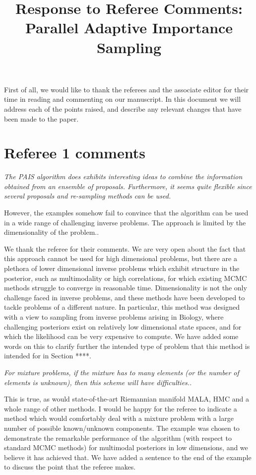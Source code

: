 \documentclass{article}
\newcommand{\comment}[2]{\vspace{0.6cm}{\bf Comment:} {\it #1.}

\vspace{0.3cm}{\bf Answer:} #2}
\begin{document}
\title{Response to Referee Comments: Parallel Adaptive Importance Sampling}
\maketitle
First of all, we would like to thank the referees and the associate editor for
their time in reading and commenting on our manuscript. In this document
we will address each of the points raised, and describe any relevant
changes that have been made to the paper.

\section*{Referee 1 comments}

\comment{The PAIS algorithm does exhibits interesting ideas to combine the information 
obtained from an ensemble of proposals. Furthermore, it seems quite flexible 
since several proposals and re-sampling methods can be used.

However, the examples somehow fail to convince that the algorithm can be used 
in a wide range of challenging inverse problems. The approach is limited by the 
dimensionality of the problem.}{We thank the referee for their comments. We are very open about the fact that this approach cannot be used for high dimensional problems, but there are a plethora of lower dimensional inverse problems which exhibit structure in the posterior, such as multimodality or high correlations, for which existing MCMC methods struggle to converge in reasonable time. Dimensionality is not the only challenge faced in inverse problems, and these methods have been developed to tackle problems of a different nature. In particular, this method was designed with a view to sampling from inverse problems arising in Biology, where challenging posteriors exist on relatively low dimensional state spaces, and for which the likelihood can be very expensive to compute. We have added some words on this to clarify further the intended type of problem that this method is intended for in Section ****.}

\comment{For mixture problems, if the mixture has to many 
elements (or the number of elements is unknown), then this scheme will have 
difficulties.}{This is true, as would state-of-the-art Riemannian manifold MALA, HMC and a whole range of other methods. I would be happy for the referee to indicate a method which would comfortably deal with a mixture problem with a large number of possible known/unknown components. The example was chosen to demonstrate the remarkable performance of the algorithm (with respect to standard MCMC methods) for multimodal posteriors in low dimensions, and we believe it has achieved that. We have added a sentence to the end of the example to discuss the point that the referee makes.}
\end{document}
